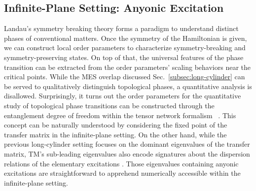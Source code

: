 \documentclass{ntuthesis}
\newcommand{\citep}{\cite}
\begin{document}

\subsection{Infinite-Plane Setting: Anyonic Excitation}
\label{subsec:infinite-plane}


Landau's symmetry breaking theory forms a paradigm to understand distinct phases of conventional matters. Once the symmetry of the Hamiltonian is given, we can construct local order parameters to characterize symmetry-breaking and symmetry-preserving states. On top of that, the universal features of the phase transition can be extracted from the order parameters' scaling behaviors near the critical points. 
%
While the MES overlap discussed Sec.~\ref{subsec:long-cylinder} can be served to qualitatively distinguish topological phases, a quantitative analysis is disallowed. Surprisingly, it turns out the order parameters for the quantitative study of topological phase transitions can be constructed through the entanglement degree of freedom within the tensor network formalism ~\citep{Haegeman_2015,2020_order_parameter}. 
%
This concept can be naturally understood by considering the fixed point of the transfer matrix in the infinite-plane setting. On the other hand, while the previous long-cylinder setting focuses on the dominant eigenvalues of the transfer matrix, TM's sub-leading eigenvalues also encode signatures about the dispersion relations of the elementary excitations \citep{2015_Zauner}. Those eigenvalues containing anyonic excitations are straightforward to apprehend numerically accessible within the infinite-plane setting. 
\end{document}
